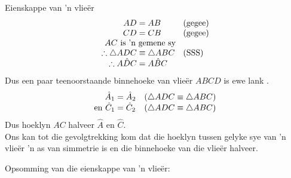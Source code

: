 \begin{wex}{Eienskappe van 'n vlie\"er}
{\begin{equation*}
\begin{array}{r@{\;}l@{\quad}l}
AD &= AB & \mbox{(gegee)} \\
CD &= CB &  \mbox{(gegee)} \\
    \multicolumn{2}{c}{AC \mbox{ is 'n gemene sy}} & \\
\therefore \triangle ADC &\equiv \triangle ABC &  \mbox{(SSS)} \\
\therefore A \hat{D}C &= A \hat{B}C & \\
\end{array}
\end{equation*}
Dus een paar teenoorstaande binnehoeke van vlie\"er $ABCD$ is ewe lank .
\begin{equation*}
 \begin{array}{r@{\;}l@{\quad}l}
 \hat{A}_{1} &= \hat{A}_{2} & \mbox{($\triangle ADC \equiv \triangle ABC$)} \\ 
\mbox{en }\hat{C}_{1} &= \hat{C}_{2} &  \mbox{($\triangle ADC \equiv \triangle ABC$)}\\ 
\end{array}
\end{equation*}
 Dus hoeklyn $AC$ halveer $\hat{A}$ en $\hat{C}$. \\
Ons kan tot die gevolgtrekking kom dat die hoeklyn tussen gelyke sye van 'n vlie\"er 'n as van simmetrie is en die binnehoeke van die vlie\"er halveer.
}
\end{wex}



Opsomming van die eienskappe van 'n vlie\"er:

